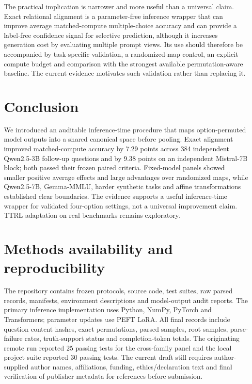 \documentclass[11pt]{article}
\begin{document}
The practical implication is narrower and more useful than a universal claim. Exact relational alignment is a parameter-free inference wrapper that can improve average matched-compute multiple-choice accuracy and can provide a label-free confidence signal for selective prediction, although it increases generation cost by evaluating multiple prompt views. Its use should therefore be accompanied by task-specific validation, a randomized-map control, an explicit compute budget and comparison with the strongest available permutation-aware baseline. The current evidence motivates such validation rather than replacing it.

\section{Conclusion}

We introduced an auditable inference-time procedure that maps option-permuted model outputs into a shared canonical space before pooling. Exact alignment improved matched-compute accuracy by 7.29 points across 384 independent Qwen2.5-3B follow-up questions and by 9.38 points on an independent Mistral-7B block; both passed their frozen paired criteria. Fixed-model panels showed smaller positive average effects and large advantages over randomized maps, while Qwen2.5-7B, Gemma-MMLU, harder synthetic tasks and affine transformations established clear boundaries. The evidence supports a useful inference-time wrapper for validated four-option settings, not a universal improvement claim. TTRL adaptation on real benchmarks remains exploratory.

\section*{Methods availability and reproducibility}

The repository contains frozen protocols, source code, test suites, raw parsed records, manifests, environment descriptions and model-output audit reports. The primary inference implementation uses Python, NumPy, PyTorch and Transformers; parameter updates use PEFT LoRA. All final records include question content hashes, exact permutations, parsed samples, root samples, parse-failure rates, truth-support status and completion-token totals. The originating remote run reported 25 passing tests for the cross-family panel and the local project suite reported 30 passing tests. The current draft still requires author-supplied author names, affiliations, funding, ethics/declaration text and final verification of publisher metadata for references before submission.
\end{document}

